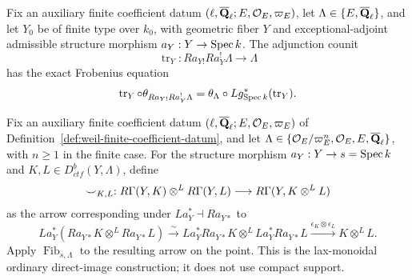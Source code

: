 
\begin{proposition}
\label{prop:weil-trace-compatibility}


Fix an auxiliary finite coefficient datum
\((\ell,\overline{\mathbf Q}_\ell;E,\mathcal O_E,\varpi_E)\), let \(\Lambda\in\{E,\overline{\mathbf Q}_\ell\}\),
and let \(Y_0\) be of finite type over \(k_0\), with geometric fiber
\(Y\) and exceptional-adjoint admissible structure morphism
\(a_Y:Y\to\operatorname{Spec} k\).  The adjunction
counit
\[
 \operatorname{tr}_Y:Ra_{Y!}Ra_Y^!\Lambda\longrightarrow\Lambda
\]
has the exact Frobenius equation
\[
 \operatorname{tr}_Y\circ\theta_{Ra_{Y!}Ra_Y^!\Lambda}
 =\theta_\Lambda\circ Lg_{\operatorname{Spec} k}^*(\operatorname{tr}_Y).
\]
\end{proposition}


\begin{definition}
\label{def:ordinary-cup-product-transformation}


Fix an auxiliary finite coefficient datum
\((\ell,\overline{\mathbf Q}_\ell;E,\mathcal O_E,\varpi_E)\) of
Definition~\ref{def:weil-finite-coefficient-datum}, and let
\(\Lambda\in\{\mathcal O_E/\varpi_E^n,\mathcal O_E,E,\overline{\mathbf Q}_\ell\}\), with
\(n\geq1\) in the finite case.  For the structure morphism
\(a_Y:Y\to s=\operatorname{Spec} k\) and
\(K,L\in D^b_{ctf}(Y,\Lambda)\), define
\[
 \smile_{K,L}:R\Gamma(Y,K)\otimes^LR\Gamma(Y,L)
 \longrightarrow R\Gamma(Y,K\otimes^LL)
\]
as the arrow corresponding under \(La_Y^*\dashv Ra_{Y*}\) to
\[
 La_Y^*(Ra_{Y*}K\otimes^LRa_{Y*}L)
 \xrightarrow{\sim}La_Y^*Ra_{Y*}K\otimes^LLa_Y^*Ra_{Y*}L
 \xrightarrow{\epsilon_K\otimes\epsilon_L}K\otimes^LL.
\]
Apply \(\operatorname{Fib}_{s,\Lambda}\) to the resulting arrow on the point.  This
is the lax-monoidal ordinary direct-image construction; it does not use
compact support.
\end{definition}


